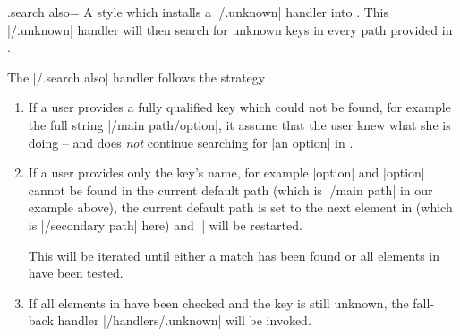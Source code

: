 \begin{handler}{{.search also}=}
    A style which installs a |/.unknown| handler into . This
    |/.unknown| handler will then search for unknown keys in every path
    provided in .
\begin{codeexample}[]


\end{codeexample}

    The |/.search also| handler follows the strategy
    \begin{enumerate}
        \item If a user provides a fully qualified key which could not be
            found, for example the full string |/main path/option|, it assume
            that the user knew what she is doing -- and does \emph{not}
            continue searching for |an option| in .
        \item If a user provides only the key's name, for example |option| and
            |option| cannot be found in the current default path (which is
            |/main path| in our example above), the current default path is set
            to the next element in  (which is |/secondary path|
            here) and |\pgfkeys| will be restarted.

            This will be iterated until either a match has been found or all
            elements in  have been tested. \item If all
            elements in  have been checked and the key is still
            unknown, the fall-back handler |/handlers/.unknown| will be
            invoked.
    \end{enumerate}
\begin{codeexample}[]




\end{codeexample}
\end{handler}
